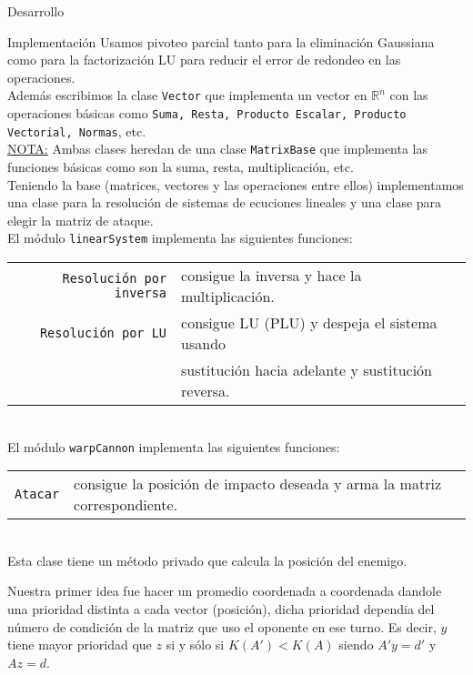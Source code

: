 \begin{section}{Desarrollo}
\begin{subsection}{Implementación}
		Usamos pivoteo parcial tanto para la eliminación Gaussiana como para la factorización LU para reducir el error de redondeo en las operaciones.\\
		
		Además escribimos la clase \texttt{Vector} que implementa un vector en $\mathbb{R}^n$ con las operaciones básicas como \texttt{Suma, Resta,
		Producto Escalar, Producto Vectorial, Normas}, etc.\\
		
		\underline{NOTA:} Ambas clases heredan de una clase \texttt{MatrixBase} que implementa las funciones básicas como son la suma, resta, multiplicación, etc.\\
		
		Teniendo la base (matrices, vectores y las operaciones entre ellos) implementamos una clase para la resolución de sistemas de ecuciones lineales y una clase para elegir la matriz de ataque.\\
		
		El módulo \texttt{linearSystem} implementa las siguientes funciones:\\
		
		\begin{tabular}{rl}
			\texttt{Resolución por inversa} & consigue la inversa y hace la multiplicación.\\
			\texttt{Resolución por LU} & consigue LU (PLU) y despeja el sistema usando\\
									   & sustitución hacia adelante y sustitución reversa.\\
		\end{tabular}\\
		
		El módulo \texttt{warpCannon} implementa las siguientes funciones:\\
		
		\begin{tabular}{rl}
			\texttt{Atacar} & consigue la posición de impacto deseada y arma la matriz correspondiente.\\
		\end{tabular}\\
		
		Esta clase tiene un método privado que calcula la posición del enemigo.
		
		Nuestra primer idea fue hacer un promedio coordenada a coordenada dandole una prioridad distinta a cada vector (posición), dicha prioridad dependia del número de condición de la matriz que uso el oponente en ese turno. Es decir, $y$ tiene mayor prioridad que $z$ si y sólo si $K(A')<K(A)$ siendo $A'y=d'$ y $Az=d$.
		

\end{subsection}
\end{section}
